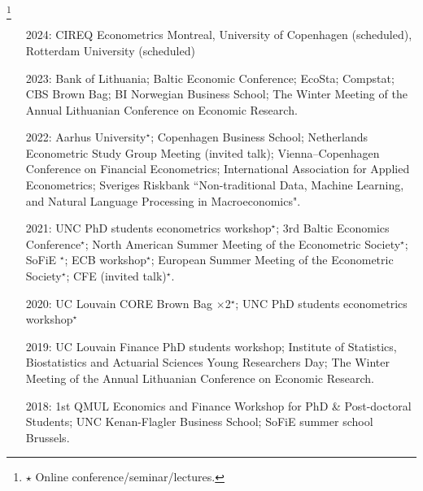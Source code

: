 \documentclass[10pt]{article}
\newcommand\blfootnote[1]{%
	\begingroup
	\renewcommand\thefootnote{}\footnote{#1}%
	\addtocounter{footnote}{-1}%
	\endgroup
}
\newcommand{\thestar}{{\Large{\color{blue}\ensuremath{\star}} }}
\newcommand{\thestarnogap}{{\Large{\color{blue}\ensuremath{^\star}}}}
\begin{document}
	\blfootnote{\thestar Online conference/seminar/lectures.} 
	\begin{itemize}[leftmargin=4.5em]
		\setlength\itemsep{-0.1em}
		\item[2024:] CIREQ Econometrics Montreal, University of Copenhagen (scheduled), Rotterdam University (scheduled) 
		\item[2023:] Bank of Lithuania; Baltic Economic Conference; EcoSta; Compstat; CBS Brown Bag; BI Norwegian Business School; The Winter Meeting of the Annual Lithuanian Conference on Economic Research.
		\item[2022:] Aarhus University\thestarnogap; Copenhagen Business School; Netherlands Econometric Study Group Meeting (invited talk); Vienna–Copenhagen Conference on Financial Econometrics; International Association for Applied Econometrics; Sveriges Riskbank ``Non-traditional Data, Machine Learning, and Natural Language Processing in Macroeconomics".
		\item[2021:] UNC PhD students econometrics workshop\thestarnogap; 3rd Baltic Economics Conference\thestarnogap; North American Summer Meeting of the Econometric Society\thestarnogap; SoFiE \thestarnogap; ECB workshop\thestarnogap; European Summer Meeting of the Econometric Society\thestarnogap; CFE (invited talk)\thestarnogap.
		\item[2020:] UC Louvain CORE Brown Bag $\times$2\thestarnogap; UNC PhD students econometrics workshop\thestarnogap
		\item[2019:] UC Louvain Finance PhD students workshop; Institute of Statistics, Biostatistics and Actuarial Sciences Young Researchers Day; The Winter Meeting of the Annual Lithuanian Conference on Economic Research.
		\item[2018:] 1st QMUL Economics and Finance Workshop for PhD \& Post-doctoral Students; UNC Kenan-Flagler Business School; SoFiE summer school Brussels.
	\end{itemize}
\end{document}
